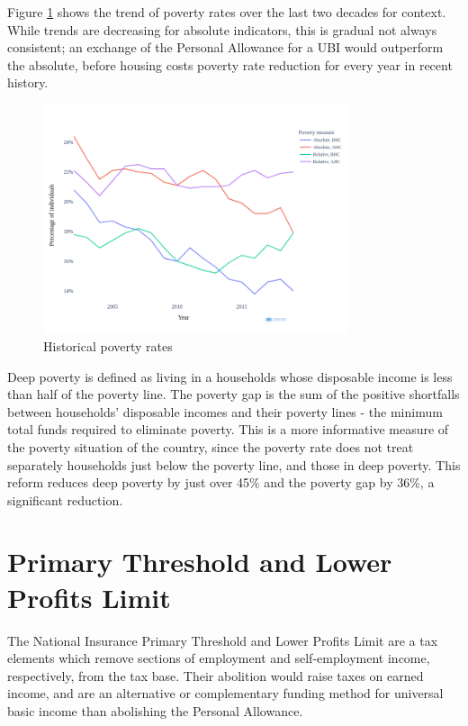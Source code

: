 \documentclass{article}
\begin{document}
    Figure \ref{fig:poverty_rates_hist} shows the trend of poverty rates over the last two decades for context. While trends are decreasing for absolute indicators, this is gradual not always consistent; an exchange of the Personal Allowance for a UBI would outperform the absolute, before housing costs poverty rate reduction for every year in recent history.

    \begin{figure}
        \centering
        \includegraphics[width=0.8\textwidth]{images/fig_5.png}
        \caption{Historical poverty rates}
        \label{fig:poverty_rates_hist}
    \end{figure}
    
    Deep poverty is defined as living in a households whose disposable income is less than half of the poverty line. The poverty gap is the sum of the positive shortfalls between households' disposable incomes and their poverty lines - the minimum total funds required to eliminate poverty. This is a more informative measure of the poverty situation of the country, since the poverty rate does not treat separately households just below the poverty line, and those in deep poverty. This reform reduces deep poverty by just over 45\% and the poverty gap by 36\%, a significant reduction.

    \section{Primary Threshold and Lower Profits Limit}

    The National Insurance Primary Threshold and Lower Profits Limit are a tax elements which remove sections of employment and self-employment income, respectively, from the tax base. Their abolition would raise taxes on earned income, and are an alternative or complementary funding method for universal basic income than abolishing the Personal Allowance.
\end{document}
